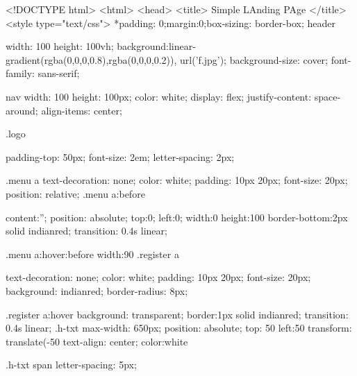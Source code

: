 <!DOCTYPE html>
<html>
    <head>
        <title>
            Simple LAnding PAge
        </title>
        <style type="text/css">
            *{padding: 0;margin:0;box-sizing: border-box;}
            header{
                width: 100%
                height: 100vh;
                background:linear-gradient(rgba(0,0,0,0.8),rgba(0,0,0,0.2)), url('f.jpg');
                background-size: cover;
                font-family:  sans-serif;
                
            }
            nav
            {
                width: 100%
                height: 100px;
                color: white;
                display: flex;
                justify-content: space-around;
                align-items: center;
            }

            .logo
            {    padding-top: 50px;
                font-size: 2em;
                letter-spacing: 2px;
                

            }

            .menu a
            {
                text-decoration: none;
                color: white;
                padding: 10px 20px;
                font-size: 20px;
                position: relative;
            }
            .menu a:before
            {
                content:'';
                position: absolute;
                top:0;
                left:0;
                width:0%
                height:100%
                border-bottom:2px solid indianred;
                transition: 0.4s linear;

            }
            .menu a:hover:before
            {
                width:90%
            }
            .register a
            {
                text-decoration: none;
                color: white;
                padding: 10px 20px;
                font-size: 20px;
                background: indianred;
                border-radius: 8px;

            }

            .register a:hover
            {
                background: transparent;
                border:1px solid indianred;
                transition: 0.4s linear;
            }
            .h-txt
            {
                max-width: 650px;
                position: absolute;
                top: 50%
                left:50%
                transform: translate(-50%
                text-align: center;
                color:white
            }

            .h-txt span
            {
                letter-spacing: 5px;
            }

